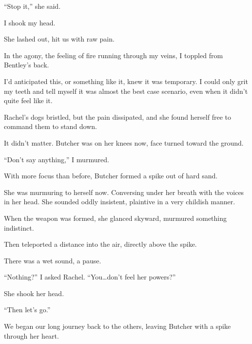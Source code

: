 ``Stop it,'' she said.



I shook my head.



She lashed out, hit us with raw pain.



In the agony, the feeling of fire running through my veins, I toppled from Bentley's back.



I'd anticipated this, or something like it, knew it was temporary.  I could only grit my teeth and tell myself it was almost the best case scenario, even when it didn't quite feel like it.



Rachel's dogs bristled, but the pain dissipated, and she found herself free to command them to stand down.



It didn't matter.  Butcher was on her knees now, face turned toward the ground.



``Don't say anything,'' I murmured.



With more focus than before, Butcher formed a spike out of hard sand.



She was murmuring to herself now.  Conversing under her breath with the voices in her head.  She sounded oddly insistent, plaintive in a very childish manner.



When the weapon was formed, she glanced skyward, murmured something indistinct.



Then teleported a distance into the air, directly above the spike.



There was a wet sound, a pause.



``Nothing?'' I asked Rachel.  ``You\ldots don't feel her powers?''



She shook her head.



``Then let's go.''



We began our long journey back to the others, leaving Butcher with a spike through her heart.



